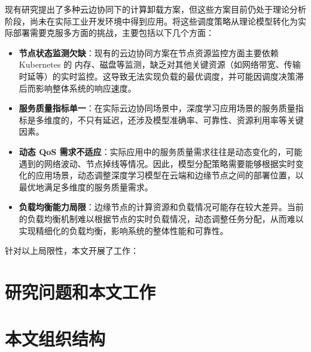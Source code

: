 现有研究提出了多种云边协同下的计算卸载方案，但这些方案目前仍处于理论分析阶段，尚未在实际工业开发环境中得到应用。将这些调度策略从理论模型转化为实际部署需要克服多方面的挑战，主要包括以下几个方面：

\begin{itemize} 
\item \textbf{节点状态监测欠缺}：现有的云边协同方案在节点资源监控方面主要依赖 Kubernetes 的 内存、磁盘等监测，缺乏对其他关键资源（如网络带宽、传输时延等）的实时监控。这导致无法实现负载的最优调度，并可能因调度决策滞后而影响整体系统的响应速度。
\item \textbf{服务质量指标单一}：在实际云边协同场景中，深度学习应用场景的服务质量指标是多维度的，不只有延迟，还涉及模型准确率、可靠性、资源利用率等关键因素。
\item \textbf{动态 QoS 需求不适应}：实际应用中的服务质量需求往往是动态变化的，可能遇到的网络波动、节点掉线等情况。因此，模型分配策略需要能够根据实时变化的应用场景，动态调整深度学习模型在云端和边缘节点之间的部署位置，以最优地满足多维度的服务质量需求。
\item \textbf{负载均衡能力局限}：边缘节点的计算资源和负载情况可能存在较大差异。当前的负载均衡机制难以根据节点的实时负载情况，动态调整任务分配，从而难以实现精细化的负载均衡，影响系统的整体性能和可靠性。
\end{itemize}

针对以上局限性，本文开展了工作：


\section{研究问题和本文工作}

\section{本文组织结构}

